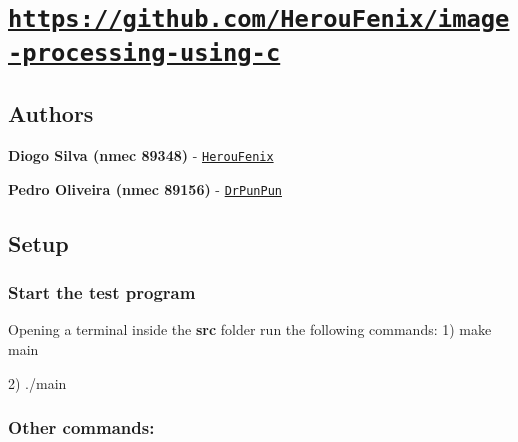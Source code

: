 \section*{\href{https://github.com/HerouFenix/image-processing-using-c}{\tt https\+://github.\+com/\+Herou\+Fenix/image-\/processing-\/using-\/c}}

\subsection*{Authors}


\begin{DoxyItemize}
\item {\bfseries Diogo Silva (nmec 89348)} -\/ \href{https://github.com/HerouFenix}{\tt Herou\+Fenix}
\item {\bfseries Pedro Oliveira (nmec 89156)} -\/ \href{https://github.com/DrPunPun}{\tt Dr\+Pun\+Pun}
\end{DoxyItemize}

\subsection*{Setup}

\subsubsection*{Start the test program}

Opening a terminal inside the {\bfseries src} folder run the following commands\+: 1) make main

2) ./main

\subsubsection*{Other commands\+:}



